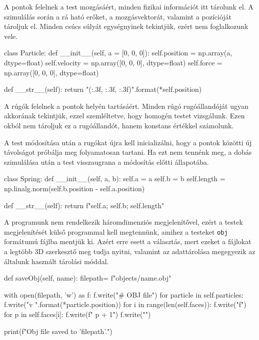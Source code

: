 
A pontok felelnek a test mozgásáért, minden fizikai információt itt tárolunk el.
A szimulálás során a rá ható erőket, a mozgásvektorát, valamint a pozícióját tároljuk el.
Minden csúcs súlyát egységnyinek tekintjük, ezért nem foglalkozunk vele.
\begin{python}
class Particle:
    def __init__(self, a = [0, 0, 0]):
        self.position = np.array(a, dtype=float) 
        self.velocity = np.array([0, 0, 0], dtype=float)
        self.force = np.array([0, 0, 0], dtype=float)

    def __str__(self):
        return "({:.3f}, {:.3f}, {:.3f})".format(*self.position)
\end{python}


A rúgók felelnek a pontok helyén tartásáért.
Minden rúgó rugóállandóját ugyan akkorának tekintjük, ezzel szemléltetve, hogy homogén testet vizsgálunk.
Ezen okból nem tároljuk ez a rugóállandót, hanem konstans értékkel számolunk.

A test módosítása után a rugókat újra kell inicializálni, hogy a pontok közötti új távolságot próbálja meg folyamatosan tartani.
Ha ezt nem tennénk meg, a dobás szimulálása után a test visszaugrana a módosítás előtti állapotába.
\begin{python}
class Spring:
    def __init__(self, a, b):
        self.a = a
        self.b = b
        self.length = np.linalg.norm(self.b.position - self.a.position)
	
    def __str__(self):
        return f"{self.a}; {self.b}; {self.length}"
\end{python}


A programunk nem rendelkezik háromdimenziós megjelenítővel, ezért a testek megjelenítését külső programmal kell megtennünk, amihez a testeket \texttt{obj} formátumú fájlba mentjük ki.
Azért erre esett a választás, mert ezeket a fájlokat a legtöbb 3D szerkesztő meg tudja nyitni, valamint az adattárolása megegyezik az általunk használt tárolási móddal.

\begin{python}
def saveObj(self, name):
    filepath= f"objects/{name}.obj"

    with open(filepath, 'w') as f:
        f.write("# OBJ file\n")
        for particle in self.particles:
            f.write("v {} {} {}\n".format(*particle.position))
        for i in range(len(self.faces)):
            f.write("f")
            for p in self.faces[i]:
                f.write(f" {p + 1}")
            f.write("\n")

    print(f"Obj file saved to '{filepath}'.")
\end{python}

